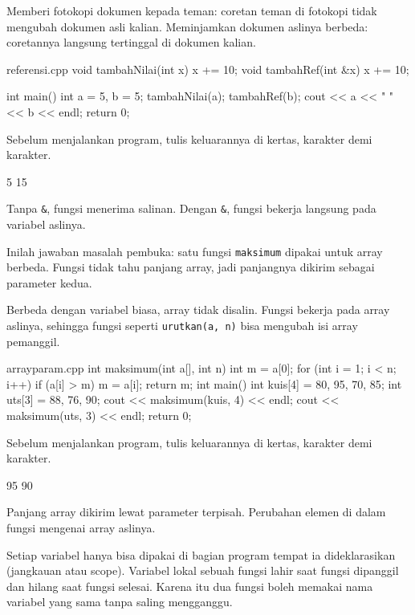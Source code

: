 \documentclass[a4paper]{article}
\begin{document}
\begin{Contoh}
Memberi fotokopi dokumen kepada teman: coretan teman di fotokopi tidak mengubah dokumen asli kalian. Meminjamkan dokumen aslinya berbeda: coretannya langsung tertinggal di dokumen kalian.
\end{Contoh}
\begin{MKode}{referensi.cpp}
void tambahNilai(int x) { x += 10; }
void tambahRef(int &x) { x += 10; }

int main() {
    int a = 5, b = 5;
    tambahNilai(a);
    tambahRef(b);
    cout << a << " " << b << endl;
    return 0;
}
\end{MKode}
\begin{Tebak}[]
Sebelum menjalankan program, tulis keluarannya di kertas, karakter demi karakter.
\end{Tebak}
\begin{Jawaban}[]
\begin{MKeluaran}[]
5 15
\end{MKeluaran}
Tanpa \texttt{\&}, fungsi menerima salinan. Dengan \texttt{\&}, fungsi bekerja langsung pada variabel aslinya.
\end{Jawaban}
Inilah jawaban masalah pembuka: satu fungsi \texttt{maksimum} dipakai untuk array berbeda. Fungsi tidak tahu panjang array, jadi panjangnya dikirim sebagai parameter kedua.

Berbeda dengan variabel biasa, array tidak disalin. Fungsi bekerja pada array aslinya, sehingga fungsi seperti \texttt{urutkan(a, n)} bisa mengubah isi array pemanggil.

\begin{MKode}{arrayparam.cpp}
int maksimum(int a[], int n) {
    int m = a[0];
    for (int i = 1; i < n; i++)
        if (a[i] > m) m = a[i];
    return m;
}
int main() {
    int kuis[4] = {80, 95, 70, 85};
    int uts[3] = {88, 76, 90};
    cout << maksimum(kuis, 4) << endl;
    cout << maksimum(uts, 3) << endl;
    return 0;
}
\end{MKode}
\begin{Tebak}[]
Sebelum menjalankan program, tulis keluarannya di kertas, karakter demi karakter.
\end{Tebak}
\begin{Jawaban}[]
\begin{MKeluaran}[]
95
90
\end{MKeluaran}
Panjang array dikirim lewat parameter terpisah. Perubahan elemen di dalam fungsi mengenai array aslinya.
\end{Jawaban}
Setiap variabel hanya bisa dipakai di bagian program tempat ia dideklarasikan (jangkauan atau scope). Variabel lokal sebuah fungsi lahir saat fungsi dipanggil dan hilang saat fungsi selesai. Karena itu dua fungsi boleh memakai nama variabel yang sama tanpa saling mengganggu.
\end{document}
